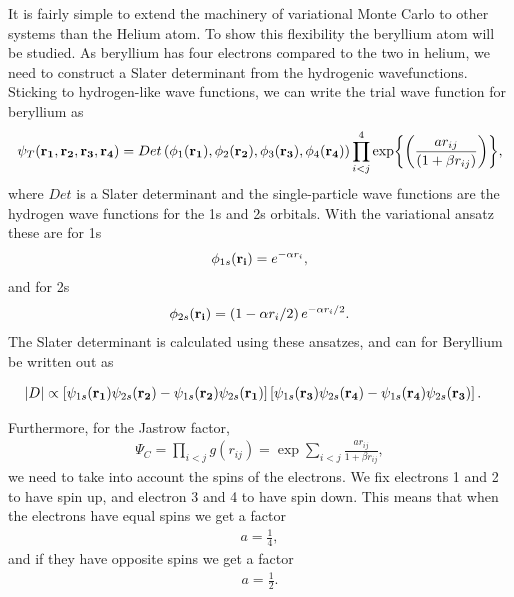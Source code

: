 		It is fairly simple to extend the machinery of variational
		Monte Carlo to other systems than the Helium atom. To show this flexibility the beryllium atom will be studied. As beryllium has
		four electrons compared to the two in helium, we need to construct a
		Slater determinant from the hydrogenic wavefunctions. Sticking to hydrogen-like wave functions,
		we can write the trial wave function for beryllium as
		\begin{equation}
			\psi_{T}({\bf r_{1}},{\bf r_{2}},{\bf r_{3}},{\bf r_{4}})=Det\left(\phi_{1}({\bf r_{1}}),\phi_{2}({\bf r_{2}}),\phi_{3}({\bf r_{3}}),\phi_{4}({\bf r_{4}})\right)\prod_{i<j}^{4}\exp{\left(\frac{a r_{ij}}{(1+\beta r_{ij})}\right)},
			\label{eq:BerylliumTrialFunction}
		\end{equation}
		where $Det$ is a Slater determinant and the single-particle wave
		functions are the hydrogen wave functions for the 1s and 2s orbitals.
		With the variational ansatz these are for 1s
		\begin{align}
			\phi_{1s}({\bf r_{i}})=e^{-\alpha r_{i}},
		\end{align}
		and for 2s
		\begin{align}
			\phi_{2s}({\bf r_{i}})=\left(1-\alpha r_{i}/2\right)e^{-\alpha r_{i}/2}.
		\end{align}
		The Slater determinant is calculated using these ansatzes, and can for Beryllium be written out as

		\begin{align}
			|D| &\propto 
			\left[ \psi_{1s}(\vb{r_1})\psi_{2s}(\vb{r_2}) -   \psi_{1s}(\vb{r_2})\psi_{2s}(\vb{r_1})  \right]
			\left[ \psi_{1s}(\vb{r_3})\psi_{2s}(\vb{r_4}) -   \psi_{1s}(\vb{r_4})\psi_{2s}(\vb{r_3})  
			\right].
		\end{align}

		Furthermore, for the Jastrow factor,
		\begin{align}
			\Psi_{C}=\prod_{i<j}g(r_{ij})=\exp{\sum_{i<j}\frac{ar_{ij}}{1+\beta r_{ij}}},
		\end{align}
		we need to take into account the spins of the electrons. We fix electrons
		1 and 2 to have spin up, and electron 3 and 4 to have spin down. This
		means that when the electrons have equal spins we get a factor
		\begin{align}
			a=\frac{1}{4},
		\end{align}
		and if they have opposite spins we get a factor
		\begin{align}
			a=\frac{1}{2}.
		\end{align}

